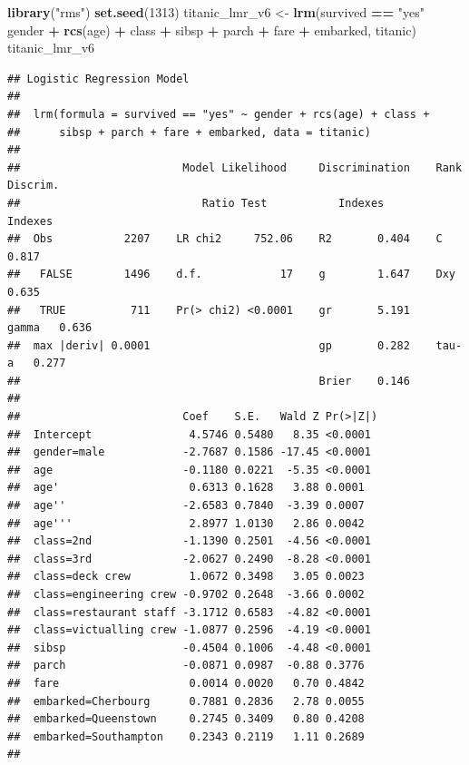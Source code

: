 \documentclass[12pt,]{krantz}
\newenvironment{Shaded}{\begin{snugshade}}{\end{snugshade}}
\newcommand{\DecValTok}[1]{\textcolor[rgb]{0.00,0.00,0.81}{#1}}
\newcommand{\KeywordTok}[1]{\textcolor[rgb]{0.13,0.29,0.53}{\textbf{#1}}}
\newcommand{\NormalTok}[1]{#1}
\newcommand{\OperatorTok}[1]{\textcolor[rgb]{0.81,0.36,0.00}{\textbf{#1}}}
\newcommand{\StringTok}[1]{\textcolor[rgb]{0.31,0.60,0.02}{#1}}
\theoremstyle{definition}
\theoremstyle{definition}
\theoremstyle{definition}
\theoremstyle{remark}
\begin{document}
\begin{Shaded}
\begin{Highlighting}[]
\KeywordTok{library}\NormalTok{(}\StringTok{"rms"}\NormalTok{)}
\KeywordTok{set.seed}\NormalTok{(}\DecValTok{1313}\NormalTok{)}
\NormalTok{titanic_lmr_v6 <-}\StringTok{ }\KeywordTok{lrm}\NormalTok{(survived }\OperatorTok{==}\StringTok{ "yes"} \OperatorTok{~}\StringTok{ }\NormalTok{gender }\OperatorTok{+}\StringTok{ }\KeywordTok{rcs}\NormalTok{(age) }\OperatorTok{+}\StringTok{ }\NormalTok{class }\OperatorTok{+}\StringTok{ }\NormalTok{sibsp }\OperatorTok{+}
\StringTok{                   }\NormalTok{parch }\OperatorTok{+}\StringTok{ }\NormalTok{fare }\OperatorTok{+}\StringTok{ }\NormalTok{embarked, titanic)}
\NormalTok{titanic_lmr_v6}
\end{Highlighting}
\end{Shaded}

\begin{verbatim}
## Logistic Regression Model
##  
##  lrm(formula = survived == "yes" ~ gender + rcs(age) + class + 
##      sibsp + parch + fare + embarked, data = titanic)
##  
##                         Model Likelihood     Discrimination    Rank Discrim.    
##                            Ratio Test           Indexes           Indexes       
##  Obs           2207    LR chi2     752.06    R2       0.404    C       0.817    
##   FALSE        1496    d.f.            17    g        1.647    Dxy     0.635    
##   TRUE          711    Pr(> chi2) <0.0001    gr       5.191    gamma   0.636    
##  max |deriv| 0.0001                          gp       0.282    tau-a   0.277    
##                                              Brier    0.146                     
##  
##                         Coef    S.E.   Wald Z Pr(>|Z|)
##  Intercept               4.5746 0.5480   8.35 <0.0001 
##  gender=male            -2.7687 0.1586 -17.45 <0.0001 
##  age                    -0.1180 0.0221  -5.35 <0.0001 
##  age'                    0.6313 0.1628   3.88 0.0001  
##  age''                  -2.6583 0.7840  -3.39 0.0007  
##  age'''                  2.8977 1.0130   2.86 0.0042  
##  class=2nd              -1.1390 0.2501  -4.56 <0.0001 
##  class=3rd              -2.0627 0.2490  -8.28 <0.0001 
##  class=deck crew         1.0672 0.3498   3.05 0.0023  
##  class=engineering crew -0.9702 0.2648  -3.66 0.0002  
##  class=restaurant staff -3.1712 0.6583  -4.82 <0.0001 
##  class=victualling crew -1.0877 0.2596  -4.19 <0.0001 
##  sibsp                  -0.4504 0.1006  -4.48 <0.0001 
##  parch                  -0.0871 0.0987  -0.88 0.3776  
##  fare                    0.0014 0.0020   0.70 0.4842  
##  embarked=Cherbourg      0.7881 0.2836   2.78 0.0055  
##  embarked=Queenstown     0.2745 0.3409   0.80 0.4208  
##  embarked=Southampton    0.2343 0.2119   1.11 0.2689  
## 
\end{verbatim}
\end{document}
